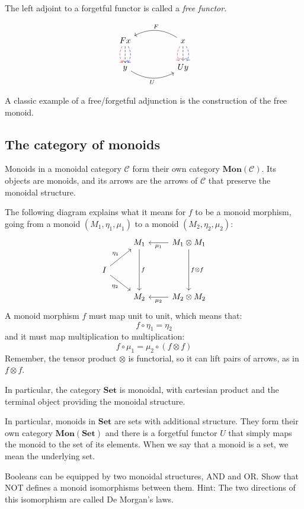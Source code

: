 \documentclass[DaoFP]{subfiles}
\begin{document}
The left adjoint to a forgetful functor is called a \emph{free functor}.

\[
 \begin{tikzcd}
F x
\arrow[d, bend right, red, dashed]
\arrow[d, dashed]
\arrow[d, bend left, blue, dashed]
  &&
  x
\arrow[d, bend right, red, dashed]
\arrow[d, dashed]
\arrow[d, bend left, blue, dashed]
 \arrow[ll, bend right, "F"']
 \\
y
   \arrow[rr, bend right, "U"']
 &&
 U y
  \end{tikzcd}
\]

A classic example of a free/forgetful adjunction is the construction of the free monoid.


\subsection{The category of monoids}
Monoids in a monoidal category $\mathcal{C}$ form their own category $\mathbf{Mon}(\mathcal{C})$. Its objects are monoids, and its arrows are the arrows of $\mathcal{C}$ that preserve the monoidal structure. 

The following diagram explains what it means for $f$ to be a monoid morphism, going from a monoid $(M_1, \eta_1, \mu_1)$ to a monoid $(M_2, \eta_2, \mu_2)$:
\[
 \begin{tikzcd}
 & M_1
 \arrow[dd, "f"]
 & M_1 \otimes M_1
 \arrow[l, "\mu_1"]
 \arrow[dd, "f \otimes f"]
 \\
 I
 \arrow[ru, "\eta_1"]
 \arrow[rd, "\eta_2"']
 \\
 & M_2
 & M_2 \otimes M_2
 \arrow[l, "\mu_2"]
  \end{tikzcd}
\]
A monoid morphism $f$ must map unit to unit, which means that:
\[ f \circ \eta_1 = \eta_2 \]
and it must map multiplication to multiplication:
\[ f \circ \mu_1 = \mu_2 \circ (f \otimes f)\]
Remember, the tensor product $\otimes$ is functorial, so it can lift pairs of arrows, as in $f \otimes f$.

In particular, the category $\mathbf{Set}$ is monoidal, with cartesian product and the terminal object providing the monoidal structure. 

In particular, monoids in $\mathbf{Set}$ are sets with additional structure. They form their own category $\mathbf{Mon}(\mathbf{Set})$ and there is a forgetful functor $U$ that simply maps the monoid to the set of its elements. When we say that a monoid is a set, we mean the underlying set.

\begin{exercise}
Booleans can be equipped by two monoidal structures, AND and OR. Show that NOT defines a monoid isomorphisms between them. Hint: The two directions of this isomorphism are called De Morgan's laws.
\end{exercise}
\end{document}
